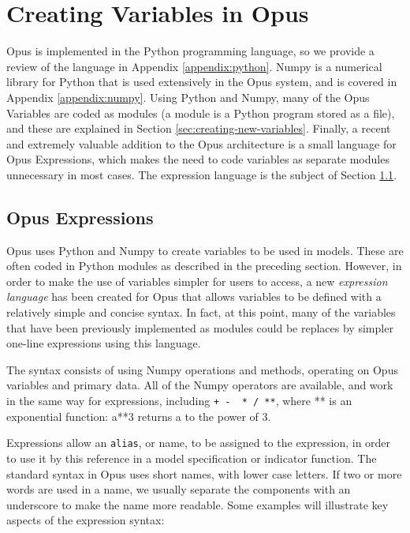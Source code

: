 \chapter{Creating Variables in Opus}
\label{chap:creating-variables}

Opus is implemented in the Python programming language, so we provide a
review of the language in Appendix \ref{appendix:python}. Numpy is a numerical
library for Python that is used extensively in the Opus system, and is
covered in Appendix \ref{appendix:numpy}. Using Python and Numpy, many of the
Opus Variables are coded as modules (a module is a Python program stored as
a file), and these are explained in Section
\ref{sec:creating-new-variables}.  Finally, a recent and extremely valuable
addition to the Opus architecture is a small language for Opus Expressions,
which makes the need to code variables as separate modules unnecessary in
most cases.  The expression language is the subject of Section
\ref{sec:expressions}.



\section{Opus Expressions}
\label{sec:expressions}

Opus uses Python and Numpy to create variables to be used in models.  These are often coded in Python modules as
described in the preceding section.  However, in order to make the use of variables simpler for users to access, a new
\emph{expression language} has been created for Opus
that allows variables to be defined with a relatively simple and concise syntax.  In fact, at this point, many of the variables that
have been previously implemented as modules could be replaces by simpler one-line expressions using this language.

The syntax consists of using Numpy operations and methods, operating on Opus variables and primary data.  All of the Numpy operators are available, and work in the same way for expressions, including \verb#+ -  * / **#, where ** is an exponential function: a**3 returns a to the power of 3.

Expressions allow an \verb#alias#, or name, to be assigned to the expression, in order to use it by this reference in a model specification or indicator function.  The standard syntax in Opus uses short names, with lower case letters.  If two or more words are used in a name, we usually separate the components with an underscore to make the name more readable.  Some examples will illustrate key aspects of the expression syntax:


